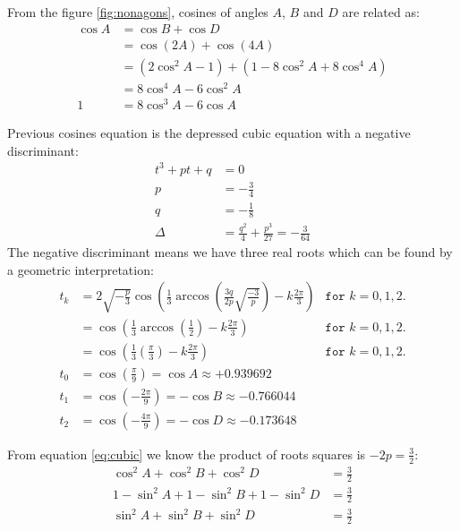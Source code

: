 \documentclass[11pt]{article}
\begin{document}
From the figure \ref{fig:nonagons}, cosines of angles $A$, $B$ and $D$ are related as:
\begin{align}
\cos{A} &= \cos{B} + \cos{D} \\
 &= \cos{(2A)} + \cos{(4A)} \nonumber\\
 &= (2\cos^2{A} - 1) + (1 -8\cos^2{A} + 8\cos^4{A}) \nonumber\\
 &= 8\cos^4{A} - 6\cos^2{A} \nonumber\\
 1 &= 8\cos^3{A} - 6\cos{A}
\end{align}

Previous cosines equation is the depressed cubic equation with a negative discriminant:
\begin{align}
t^3 +pt +q &= 0 \label{eq:cubic}\\
p &= -\frac{3}{4}\\
q &= -\frac{1}{8}\\
\Delta &= \frac{q^2}{4} + \frac{p^3}{27} = -\frac{3}{64} \nonumber
\end{align}
The negative discriminant means we have three real roots which can be found by a geometric interpretation:
\begin{align}
t_k &= 2\sqrt{-\frac{p}{3}}\cos\left({\frac{1}{3}\arccos\left(
\frac{3q}{2p}\sqrt{\frac{-3}{p}}
\right) -k\frac{2\pi}{3}}\right) &\texttt{for } k=0,1,2. \nonumber\\
&= \cos\left(\frac{1}{3}\arccos\left(\frac{1}{2}\right) -k\frac{2\pi}{3} \right)  &\texttt{for } k=0,1,2. \nonumber\\
&= \cos\left(\frac{1}{3}\left(\frac{\pi}{3}\right) -k\frac{2\pi}{3} \right)  &\texttt{for } k=0,1,2. \nonumber\\
t_0 &= \cos\left(\frac{\pi}{9}\right) = \cos{A} \approx +0.939692\\
t_1 &= \cos\left(-\frac{2\pi}{9}\right) = -\cos{B} \approx -0.766044 \\
t_2 &= \cos\left(-\frac{4\pi}{9}\right) = -\cos{D} \approx -0.173648
\end{align}

From equation \ref{eq:cubic} we know the product of roots squares is $-2p = \frac{3}{2}$:
\begin{align}
\cos^2{A} + \cos^2{B} + \cos^2{D} &= \frac{3}{2} \\
1 - \sin^2{A} + 1 - \sin^2{B} + 1 - \sin^2{D} &= \frac{3}{2} \nonumber\\
\sin^2{A} + \sin^2{B} + \sin^2{D} &= \frac{3}{2}
\end{align}
\end{document}
